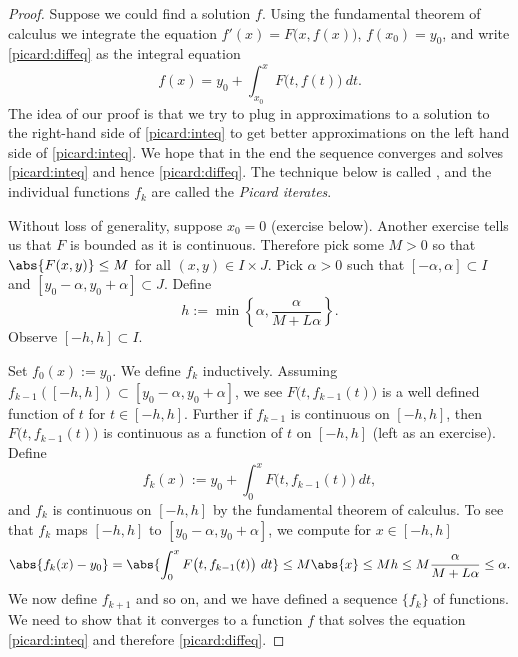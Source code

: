 \documentclass[12pt]{book}
\begin{document}
\begin{proof}
Suppose we could find a solution $f$.
Using the fundamental
theorem of calculus we integrate the equation 
$f'(x) = F\bigl(x,f(x)\bigr)$, $f(x_0) = y_0$, and write \eqref{picard:diffeq}
as the integral equation
\begin{equation} \label{picard:inteq}
f(x) = y_0 + \int_{x_0}^x F\bigl(t,f(t)\bigr)~dt .
\end{equation}
The idea of our proof is that we try to plug in approximations to
a solution to the right-hand side of \eqref{picard:inteq} to get better approximations on the left
hand side of  \eqref{picard:inteq}.
We hope that in the end the sequence 
converges and solves
\eqref{picard:inteq} and hence \eqref{picard:diffeq}.
The technique below is called \emph{},
and the individual functions $f_k$ are called the 
\emph{Picard iterates}.

Without loss of generality, suppose $x_0 = 0$ (exercise below).
Another
exercise tells us that $F$ is bounded as it is continuous.
Therefore pick some $M > 0$ so that 
$\abs{F(x,y)} \leq M$ for all $(x,y) \in I\times J$.
Pick $\alpha > 0$ such that
$[-\alpha,\alpha] \subset I$ and $[y_0-\alpha, y_0 + \alpha] \subset J$.
Define
\begin{equation*}
h := \min \left\{ \alpha, \frac{\alpha}{M+L\alpha} \right\} .
\end{equation*}
Observe
$[-h,h] \subset I$.

Set $f_0(x) := y_0$.
We define $f_k$ inductively.
Assuming $f_{k-1}([-h,h]) \subset [y_0-\alpha,y_0+\alpha]$,
we see 
$F\bigl(t,f_{k-1}(t)\bigr)$ is
a well defined function of $t$ for $t \in [-h,h]$.
Further if $f_{k-1}$ is continuous
on $[-h,h]$, then
$F\bigl(t,f_{k-1}(t)\bigr)$ is
continuous as
a function of $t$ on $[-h,h]$ (left as an exercise).
Define
\begin{equation*}
f_k(x) := y_0+ \int_{0}^x F\bigl(t,f_{k-1}(t)\bigr)~dt ,
\end{equation*}
and $f_k$ is continuous on $[-h,h]$ by the fundamental theorem of calculus.
To see that $f_k$ maps $[-h,h]$ to $[y_0-\alpha,y_0+\alpha]$, we compute for
$x \in [-h,h]$
\begin{equation*}
\abs{f_k(x) - y_0} = 
\abs{\int_{0}^x F\bigl(t,f_{k-1}(t)\bigr)~dt }
\leq
M\abs{x}
\leq
Mh
\leq
M
\frac{\alpha}{M+L\alpha}
\leq \alpha .
\end{equation*}
We now define $f_{k+1}$ and so on, and
we have defined a sequence $\{ f_k \}$ of functions.
We need
to show that it converges to a function $f$ that solves
the equation \eqref{picard:inteq} and therefore \eqref{picard:diffeq}.


\end{proof}
\end{document}
